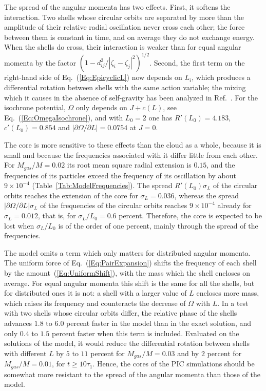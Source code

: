 The spread of the angular momenta has two effects. First, it softens the interaction. Two shells whose circular orbits are separated by more than the amplitude of their relative radial oscillation never cross each other; the force between them is constant in time, and on average they do not exchange energy. When the shells do cross, their interaction is weaker than for equal angular momenta by the factor $(1 - d_{ij}^2/|\zeta_i - \zeta_j|^2)^{1/2}$. Second, the first term on the right-hand side of Eq.~(\ref{Eq:EpicyclicL}) now depends on $L_i$, which produces a differential rotation between shells with the same action variable; the mixing which it causes in the absence of self-gravity has been analyzed in Ref.~\cite{pRoS20}. For the isochrone potential, $\Omega$ only depends on $J + c(L)$, see Eq.~(\ref{Eq:OmegaIsochrone}), and with $L_0 = 2$ one has $R'(L_0) = 4.183$, $c'(L_0) = 0.854$ and $|\partial\Omega/\partial L| = 0.0754$ at $J = 0$.

The core is more sensitive to these effects than the cloud as a whole, because it is small and because the frequencies associated with it differ little from each other. For $M_{gas}/M = 0.02$ its root mean square radial extension is $0.15$, and the frequencies of its particles exceed the frequency of its oscillation by about $9\times 10^{-4}$ (Table~\ref{Tab:ModelFrequencies}). The spread $R'(L_0)\sigma_L$ of the circular orbits reaches the extension of the core for $\sigma_L = 0.036$, whereas the spread $|\partial\Omega/\partial L|\sigma_L$ of the frequencies of the circular orbits reaches $9\times 10^{-4}$ already for $\sigma_L = 0.012$, that is, for $\sigma_L/L_0 = 0.6$ percent. Therefore, the core is expected to be lost when $\sigma_L/L_0$ is of the order of one percent, mainly through the spread of the frequencies.

The model omits a term which only matters for distributed angular momenta. The uniform force of Eq.~(\ref{Eq:PairExpansion}) shifts the frequency of each shell by the amount~(\ref{Eq:UniformShift}), with the mass which the shell encloses on average. For equal angular momenta this shift is the same for all the shells, but for distributed ones it is not: a shell with a larger value of $L$ encloses more mass, which raises its frequency and counteracts the decrease of $\Omega$ with $L$. In a test with two shells whose circular orbits differ, the relative phase of the shells advances $1.8$ to $6.0$ percent faster in the model than in the exact solution, and only $0.4$ to $1.5$ percent faster when this term is included. Evaluated on the solutions of the model, it would reduce the differential rotation between shells with different $L$ by $5$ to $11$ percent for $M_{gas}/M = 0.03$ and by $2$ percent for $M_{gas}/M = 0.01$, for $t\geq 10\tau_1$. Hence, the cores of the PIC simulations should be somewhat more resistant to the spread of the angular momenta than those of the model.


